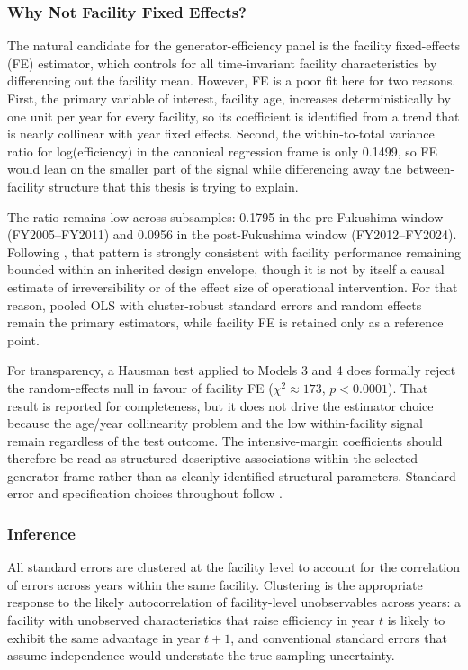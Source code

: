 \documentclass[12pt,a4paper]{article}
\begin{document}
\subsubsection{Why Not Facility Fixed Effects?}

The natural candidate for the generator-efficiency panel is the facility fixed-effects (FE) estimator, which controls for all time-invariant facility characteristics by differencing out the facility mean. However, FE is a poor fit here for two reasons. First, the primary variable of interest, facility age, increases deterministically by one unit per year for every facility, so its coefficient is identified from a trend that is nearly collinear with year fixed effects. Second, the within-to-total variance ratio for log(efficiency) in the canonical regression frame is only 0.1499, so FE would lean on the smaller part of the signal while differencing away the between-facility structure that this thesis is trying to explain.

The ratio remains low across subsamples: 0.1795 in the pre-Fukushima window (FY2005--FY2011) and 0.0956 in the post-Fukushima window (FY2012--FY2024). Following \citet{Seto2016}, that pattern is strongly consistent with facility performance remaining bounded within an inherited design envelope, though it is not by itself a causal estimate of irreversibility or of the effect size of operational intervention. For that reason, pooled OLS with cluster-robust standard errors and random effects remain the primary estimators, while facility FE is retained only as a reference point.

For transparency, a Hausman test applied to Models 3 and 4 does formally reject the random-effects null in favour of facility FE ($\chi^2 \approx 173$, $p < 0.0001$). That result is reported for completeness, but it does not drive the estimator choice because the age/year collinearity problem and the low within-facility signal remain regardless of the test outcome. The intensive-margin coefficients should therefore be read as structured descriptive associations within the selected generator frame rather than as cleanly identified structural parameters. Standard-error and specification choices throughout follow \citet{Wooldridge2010}.

\subsubsection{Inference}

All standard errors are clustered at the facility level to account for the correlation of errors across years within the same facility. Clustering is the appropriate response to the likely autocorrelation of facility-level unobservables across years: a facility with unobserved characteristics that raise efficiency in year $t$ is likely to exhibit the same advantage in year $t+1$, and conventional standard errors that assume independence would understate the true sampling uncertainty.
\end{document}
